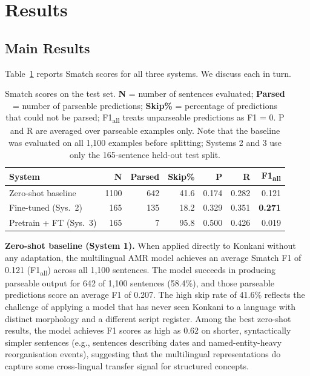 \section{Results}
\label{sec:results}

\subsection{Main Results}

Table~\ref{tab:main_results} reports Smatch scores for all three systems. We discuss each in turn.

\begin{table}[t]
\centering
\small
\begin{tabular}{lrrrrrr}
\toprule
\textbf{System} & \textbf{N} & \textbf{Parsed} & \textbf{Skip\%} & \textbf{P} & \textbf{R} & \textbf{F1\textsubscript{all}} \\
\midrule
Zero-shot baseline     & 1100 & 642 & 41.6 & 0.174 & 0.282 & 0.121 \\
Fine-tuned (Sys.\ 2)   & 165  & 135 & 18.2 & 0.329 & 0.351 & \textbf{0.271} \\
Pretrain + FT (Sys.\ 3)& 165  & 7   & 95.8 & 0.500 & 0.426 & 0.019 \\
\bottomrule
\end{tabular}
\caption{Smatch scores on the test set. \textbf{N} = number of sentences evaluated; \textbf{Parsed} = number of parseable predictions; \textbf{Skip\%} = percentage of predictions that could not be parsed; F1\textsubscript{all} treats unparseable predictions as F1 = 0. P and R are averaged over parseable examples only. Note that the baseline was evaluated on all 1,100 examples before splitting; Systems 2 and 3 use only the 165-sentence held-out test split.}
\label{tab:main_results}
\end{table}

\textbf{Zero-shot baseline (System 1).}
When applied directly to Konkani without any adaptation, the multilingual AMR model achieves an average Smatch F1 of 0.121 (F1\textsubscript{all}) across all 1,100 sentences. The model succeeds in producing parseable output for 642 of 1,100 sentences (58.4\%), and those parseable predictions score an average F1 of 0.207. The high skip rate of 41.6\% reflects the challenge of applying a model that has never seen Konkani to a language with distinct morphology and a different script register. Among the best zero-shot results, the model achieves F1 scores as high as 0.62 on shorter, syntactically simpler sentences (e.g., sentences describing dates and named-entity-heavy reorganisation events), suggesting that the multilingual representations do capture some cross-lingual transfer signal for structured concepts.


